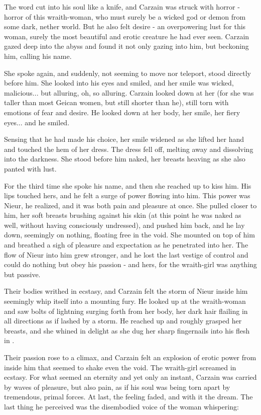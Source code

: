 The word cut into his soul like a knife, and Carzain was struck with horror - horror of this wraith-woman, who must surely be a wicked god or demon from some dark, nether world. But he also felt desire - an overpowering lust for this woman, surely the most beautiful and erotic creature he had ever seen. Carzain gazed deep into the abyss and found it not only gazing into him, but beckoning him, calling his name. 


She spoke again, and suddenly, not seeming to move nor teleport, stood directly before him. She looked into his eyes and smiled, and her smile was wicked, malicious... but alluring, oh, so alluring. Carzain looked down at her (for she was taller than most Geican women, but still shorter than he), still torn with emotions of fear and desire. He looked down at her body, her smile, her fiery eyes... and he smiled. 

Sensing that he had made his choice, her smile widened as she lifted her hand and touched the hem of her dress. The dress fell off, melting away and dissolving into the darkness. She stood before him naked, her breasts heaving as she also panted with lust. 


For the third time she spoke his name, and then she reached up to kiss him. His lips touched hers, and he felt a surge of power flowing into him. This power was Nieur, he realized, and it was both pain and pleasure at once. She pulled closer to him, her soft breasts brushing against his skin (at this point he was naked as well, without having consciously undressed), and pushed him back, and he lay down, seemingly on nothing, floating free in the void. She mounted on top of him and breathed a sigh of pleasure and expectation as he penetrated into her. The flow of Nieur into him grew stronger, and he lost the last vestige of control and could do nothing but obey his passion - and hers, for the wraith-girl was anything but passive. 

Their bodies writhed in ecstasy, and Carzain felt the storm of Nieur inside him seemingly whip itself into a mounting fury. He looked up at the wraith-woman and saw bolts of lightning surging forth from her body, her dark hair flailing in all directions as if lashed by a storm. He reached up and roughly grasped her breasts, and she whined in delight as she dug her sharp fingernails into his flesh in . 

Their passion rose to a climax, and Carzain felt an explosion of erotic power from inside him that seemed to shake even the void. The wraith-girl screamed in ecstasy. For what seemed an eternity and yet only an instant, Carzain was carried by waves of pleasure, but also pain, as if his soul was being torn apart by tremendous, primal forces. At last, the feeling faded, and with it the dream. The last thing he perceived was the disembodied voice of the woman whispering: 

